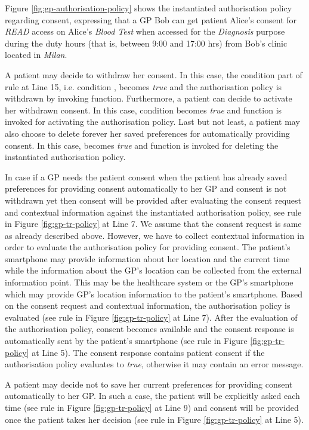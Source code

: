 \documentclass[10pt, conference, compsocconf]{IEEEtran}
\begin{document}
Figure \ref{fig:gp-authorisation-policy} shows the instantiated authorisation policy regarding consent, expressing that a GP Bob can get patient Alice's consent for \emph{READ} access on Alice's \emph{Blood Test} when accessed for the \emph{Diagnosis} purpose during the duty hours (that is, between 9:00 and 17:00 hrs) from Bob's clinic located in \emph{Milan}.

A patient may decide to withdraw her consent. In this case, the condition part of rule at Line 15, i.e. condition , becomes \emph{true} and the authorisation policy is withdrawn by invoking  function. Furthermore, a patient can decide to activate her withdrawn consent. In this case, condition  becomes \emph{true} and  function is invoked for activating the authorisation policy. Last but not least, a patient may also choose to delete forever her saved preferences for automatically providing consent. In this case,  becomes \emph{true} and  function is invoked for deleting the instantiated authorisation policy.

In case if a GP needs the patient consent when the patient has already saved preferences for providing consent automatically to her GP and consent is not withdrawn yet then consent will be provided after evaluating the consent request and contextual information against the instantiated authorisation policy, see rule in Figure \ref{fig:gp-tr-policy} at Line 7. We assume that the consent request is same as already described above. However, we have to collect contextual information in order to evaluate the authorisation policy for providing consent. The patient's smartphone may provide information about her location and the current time while the information about the GP's location can be collected from the external information point. This may be the healthcare system or the GP's smartphone which may provide GP's location information to the patient's smartphone. Based on the consent request and contextual information, the authorisation policy is evaluated (see rule in Figure \ref{fig:gp-tr-policy} at Line 7). After the evaluation of the authorisation policy, consent becomes available and the consent response is automatically sent by the patient's smartphone (see rule in Figure \ref{fig:gp-tr-policy} at Line 5). The consent response contains patient consent if the authorisation policy evaluates to \emph{true}, otherwise it may contain an error message.

A patient may decide not to save her current preferences for providing consent automatically to her GP. In such a case, the patient will be explicitly asked each time (see rule in Figure \ref{fig:gp-tr-policy} at Line 9) and consent will be provided once the patient takes her decision (see rule in Figure \ref{fig:gp-tr-policy} at Line 5).
\end{document}
